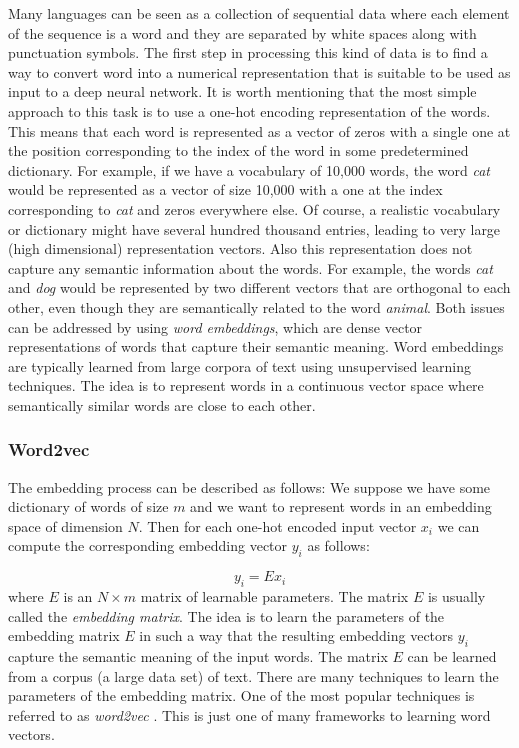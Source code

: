 Many languages can be seen as a collection of sequential data where each element of the sequence is a word and they are separated by white spaces along with punctuation symbols. The first step in processing this kind of data is to find a way to convert word into a numerical representation that is suitable to be used as input to a deep neural network. It is worth mentioning that the most simple approach to this task is to use a one-hot encoding representation of the words. This means that each word is represented as a vector of zeros with a single one at the position corresponding to the index of the word in some predetermined dictionary. For example, if we have a vocabulary of 10,000 words, the word \textit{cat} would be represented as a vector of size 10,000 with a one at the index corresponding to \textit{cat} and zeros everywhere else. Of course, a realistic vocabulary or dictionary might have several hundred thousand entries, leading to very large (high dimensional) representation vectors. Also this representation does not capture any semantic information about the words. For example, the words \textit{cat} and \textit{dog} would be represented by two different vectors that are orthogonal to each other, even though they are semantically related to the word \textit{animal}. Both issues can be addressed by using \emph{word embeddings}, which are dense vector representations of words that capture their semantic meaning. Word embeddings are typically learned from large corpora of text using unsupervised learning techniques. The idea is to represent words in a continuous vector space where semantically similar words are close to each other. 

\subsubsection*{Word2vec}
The embedding process can be described as follows: We suppose we have some dictionary of words of size $m$ and we want to represent words in an embedding space of dimension $N$. Then for each one-hot encoded input vector $x_i$ we can compute the corresponding embedding vector $y_i$ as follows:

\begin{equation}
    y_i = E x_i
\end{equation}
where $E$ is an $N \times m$ matrix of learnable parameters. The matrix $E$ is usually called the \emph{embedding matrix}. The idea is to learn the parameters of the embedding matrix $E$ in such a way that the resulting embedding vectors $y_i$ capture the semantic meaning of the input words. The matrix $E$ can be learned from a corpus (a large data set) of text. There are many techniques to learn the parameters of the embedding matrix. One of the most popular techniques is referred to as \emph{word2vec} \cite{mikolovEfficientEstimationWord2013}. This is just one of many frameworks to learning word vectors. 

